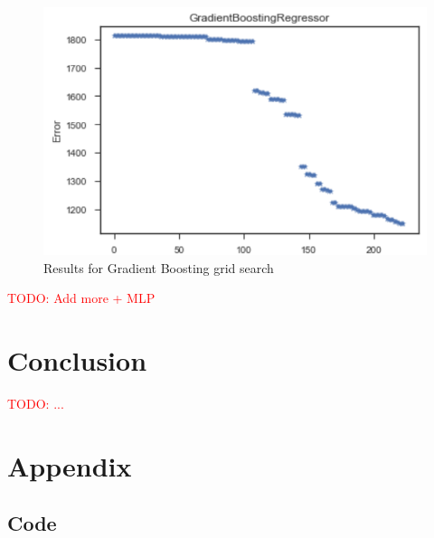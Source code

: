 \documentclass[a4paper]{article}
\newcommand\todo[1]{\textcolor{red}{TODO: #1}}
\begin{document}
\begin{figure}[H]
\centering
\includegraphics{Images/gbr.png}
\caption{Results for Gradient Boosting grid search}
\label{fig:gbr}
\end{figure}

\todo{Add more + MLP}




\section{Conclusion}
\todo{...}


\newpage
\appendix
\section{Appendix}

\subsection{Code} %
\label{sec:code}

\end{document}
